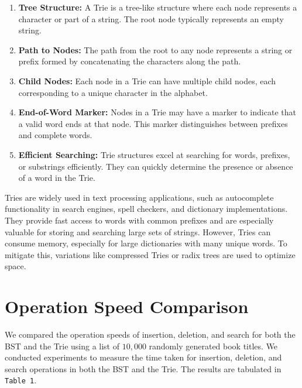 \documentclass{article}
\begin{document}
\begin{enumerate}
    \item \textbf{Tree Structure:} A Trie is a tree-like structure where each node represents a character or part of a string. The root node typically represents an empty string.

    \item \textbf{Path to Nodes:} The path from the root to any node represents a string or prefix formed by concatenating the characters along the path.

    \item \textbf{Child Nodes:} Each node in a Trie can have multiple child nodes, each corresponding to a unique character in the alphabet.

    \item \textbf{End-of-Word Marker:} Nodes in a Trie may have a marker to indicate that a valid word ends at that node. This marker distinguishes between prefixes and complete words.

    \item \textbf{Efficient Searching:} Trie structures excel at searching for words, prefixes, or substrings efficiently. They can quickly determine the presence or absence of a word in the Trie.
\end{enumerate}
Tries are widely used in text processing applications, such as autocomplete functionality in search engines, spell checkers, and dictionary implementations. They provide fast access to words with common prefixes and are especially valuable for storing and searching large sets of strings. However, Tries can consume memory, especially for large dictionaries with many unique words. To mitigate this, variations like compressed Tries or radix trees are used to optimize space.

\section{Operation Speed Comparison}
We compared the operation speeds of insertion, deletion, and search for both the BST and the Trie using a list of $10,000$ randomly generated book titles. We conducted experiments to measure the time taken for insertion, deletion, and search operations in both the BST and the Trie. The results are tabulated in  \texttt{Table 1}.
\end{document}
